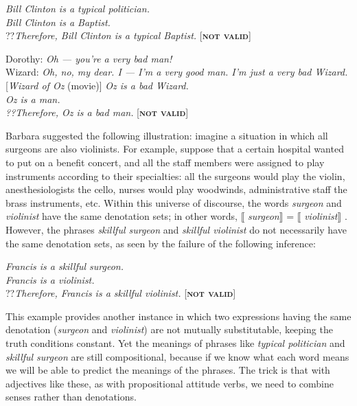 \ea \label{ex:15.6}
\textit{Bill Clinton is a typical politician.}\\
\textit{Bill Clinton is a Baptist.}\\\FelixHRule
??\textit{Therefore, Bill Clinton is a typical Baptist.} \hfill  [\textbf{\textsc{not valid}}]
\z

\ea \label{ex:15.7}
\ea  Dorothy: \textit{Oh — you’re a very bad man!}\\
Wizard: \textit{Oh, no, my dear. I — I’m a very good man. I’m just a very bad Wizard.} [\textit{Wizard of Oz} (movie)]
\ex  \label{ex:15.}
  \textit{Oz is a bad Wizard.}\\
\textit{Oz is a man.\\
\FelixHRule
??Therefore, Oz is a bad man.}  \hfill [\textbf{\textsc{not valid}}]
\z \z


Barbara \citet{Partee1995} suggested the following illustration: imagine a situation in which all surgeons are also violinists. For example, suppose that a certain hospital wanted to put on a benefit concert, and all the staff members were assigned to play instruments according to their specialties: all the surgeons would play the violin, anesthesiologists the cello, nurses would play woodwinds, administrative staff the brass instruments, etc. Within this universe of discourse, the words \textit{surgeon} and \textit{violinist} have the same denotation sets; in other words, $\llbracket$ \textit{surgeon}$\rrbracket$  = $\llbracket$ \textit{violinist}$\rrbracket$ . However, the phrases \textit{skillful surgeon} and \textit{skillful violinist} do not necessarily have the same denotation sets, as seen by the failure of the following inference:


\ea \label{ex:15.8}
\textit{Francis is a skillful surgeon.}\\
\textit{Francis is a violinist.}\\
\FelixHRule
??\textit{Therefore, Francis is a skillful violinist.}  \hfill [\textbf{\textsc{not valid}}]
\z


This example provides another instance in which two expressions having the same denotation (\textit{surgeon} and \textit{violinist}) are not mutually substitutable, keeping the truth conditions constant. Yet the meanings of phrases like \textit{typical politician} and \textit{skillful surgeon} are still compositional, because if we know what each word means we will be able to predict the meanings of the phrases. The trick is that with adjectives like these, as with propositional attitude verbs, we need to combine senses rather than denotations.



